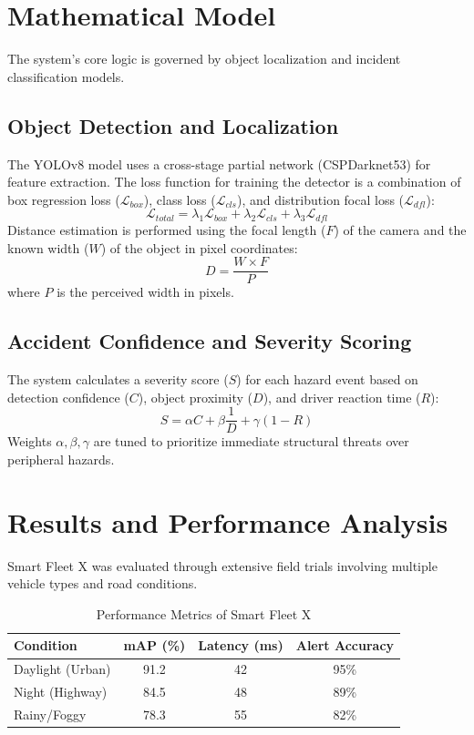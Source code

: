 \documentclass[conference]{IEEEtran}
\begin{document}
\section{Mathematical Model}
The system's core logic is governed by object localization and incident classification models.

\subsection{Object Detection and Localization}
The YOLOv8 model uses a cross-stage partial network (CSPDarknet53) for feature extraction. The loss function for training the detector is a combination of box regression loss (\(\mathcal{L}_{box}\)), class loss (\(\mathcal{L}_{cls}\)), and distribution focal loss (\(\mathcal{L}_{dfl}\)):
\[
\mathcal{L}_{total} = \lambda_1 \mathcal{L}_{box} + \lambda_2 \mathcal{L}_{cls} + \lambda_3 \mathcal{L}_{dfl}
\]
Distance estimation is performed using the focal length (\(F\)) of the camera and the known width (\(W\)) of the object in pixel coordinates:
\[
D = \frac{W \times F}{P}
\]
where \(P\) is the perceived width in pixels.

\subsection{Accident Confidence and Severity Scoring}
The system calculates a severity score (\(S\)) for each hazard event based on detection confidence (\(C\)), object proximity (\(D\)), and driver reaction time (\(R\)):
\[
S = \alpha C + \beta \frac{1}{D} + \gamma (1 - R)
\]
Weights \(\alpha, \beta, \gamma\) are tuned to prioritize immediate structural threats over peripheral hazards.

\section{Results and Performance Analysis}
Smart Fleet X was evaluated through extensive field trials involving multiple vehicle types and road conditions.

\begin{table}[htbp]
  \caption{Performance Metrics of Smart Fleet X}
  \label{tab:metrics}
  \centering
  \begin{tabular}{lccc}
    \toprule
    Condition & mAP (\%) & Latency (ms) & Alert Accuracy \\
    \midrule
    Daylight (Urban) & 91.2 & 42 & 95\% \\
    Night (Highway) & 84.5 & 48 & 89\% \\
    Rainy/Foggy & 78.3 & 55 & 82\% \\
    \bottomrule
  \end{tabular}
\end{table}
\end{document}
